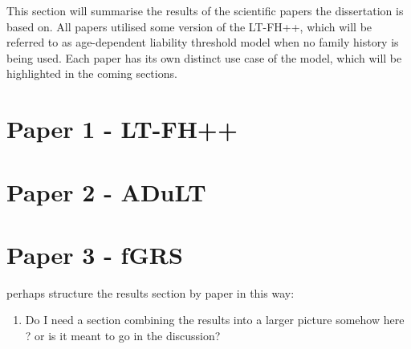 


This section will summarise the results of the scientific papers the dissertation is based on. All papers utilised some version of the LT-FH++, which will be referred to as age-dependent liability threshold model when no family history is being used. Each paper has its own distinct use case of the model, which will be highlighted in the coming sections.

\section{Paper 1 - LT-FH++}

\newpage

\section{Paper 2 - ADuLT}

\newpage

\section{Paper 3 - fGRS}

\newpage



perhaps structure the results section by paper in this way:

\begin{enumerate}
	\item Do I need a section combining the results into a larger picture somehow here ? or is it meant to go in the discussion?
\end{enumerate}
